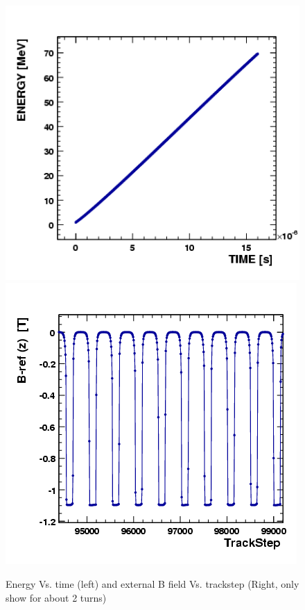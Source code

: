 \begin{figure}[ht]
  \begin{center} 
    \includegraphics[width=0.45\linewidth]{figures/cyclotron/Inj2-ENERGY-TIME.png}
    \includegraphics[width=0.45\linewidth]{figures/cyclotron/Inj2-B-ref-z-TrackStep.png}
    \caption{Energy Vs. time (left) and external B field Vs. trackstep (Right, only show for about 2 turns)}
    \label{fig:cyclParameters}
  \end{center}
\end{figure}

